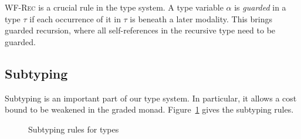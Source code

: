 \textsc{WF-Rec} is a crucial rule in the type system. A type variable $\alpha$ is \emph{guarded} in a type $\tau$ if each
occurrence of it in $\tau$ is beneath a later modality. This brings guarded recursion, where all self-references in the recursive type need to be 
guarded.

\subsection{Subtyping}
Subtyping is an important part of our type system. In particular, it allows a cost bound to be weakened in the graded monad. 
Figure~\ref{def:worst-case-subtyping} gives the subtyping rules.

\begin{figure}[!htbp]
  \small
  \caption{Subtyping rules for types}
  \label{def:worst-case-subtyping}
\end{figure}


